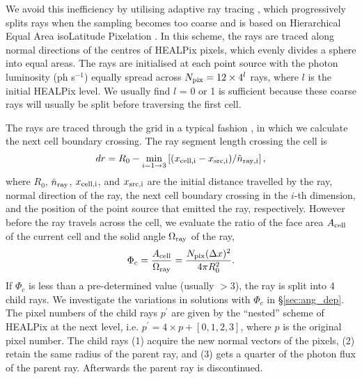 \documentclass[useAMS,usenatbib]{mn2e}
\begin{document}
We avoid this inefficiency by utilising adaptive ray tracing
\citep{Abel02_RT}, which progressively splits rays when the sampling
becomes too coarse and is based on Hierarchical Equal Area isoLatitude
Pixelation \citep[HEALPix;][]{HEALPix}.  In this scheme, the rays are
traced along normal directions of the centres of HEALPix pixels, which
evenly divides a sphere into equal areas.  The rays are initialised at
each point source with the photon luminosity (ph s$^{-1}$) equally
spread across $N_{\rm pix} = 12 \times 4^l$ rays, where $l$ is the
initial HEALPix level.  We usually find $l$ = 0 or 1 is sufficient
because these coarse rays will usually be split before traversing
the first cell.

The rays are traced through the grid in a typical fashion
\citep[e.g.][]{Abel99_RT}, in which we calculate the next cell
boundary crossing.  The ray segment length crossing the cell is
%
\begin{equation}
  \label{eqn:trace}
  dr = R_0 - \min_{i=1 \rightarrow 3} \left[(x_{\rm cell,i} - x_{\rm src,i}) /
    \hat{n}_{\rm ray,i} \right],
\end{equation}
%
where $R_0$, $\hat{n}_{\rm ray}$, $x_{\rm cell,i}$, and $x_{\rm
  src,i}$ are the initial distance travelled by the ray, normal
direction of the ray, the next cell boundary crossing in the $i$-th
dimension, and the position of the point source that emitted the ray,
respectively.  However before the ray travels across the cell, we
evaluate the ratio of the face area $A_{\rm cell}$ of the current cell
and the solid angle $\Omega_{\rm ray}$ of the ray,
%
\begin{equation}
  \label{eqn:split}
  \Phi_c = \frac{A_{\rm cell}} {\Omega_{\rm ray}} = 
  \frac{N_{\rm pix} (\Delta x)^2} {4\pi R_0^2}.
\end{equation}
%
If $\Phi_c$ is less than a pre-determined value (usually $>3$), the
ray is split into 4 child rays.  We investigate the variations in
solutions with $\Phi_c$ in \S\ref{sec:ang_dep}.  The pixel numbers
of the child rays $p^\prime$ are given by the ``nested'' scheme of
HEALPix at the next level, i.e. $p^\prime = 4 \times p + [0,1,2,3]$,
where $p$ is the original pixel number.  The child rays (1) acquire
the new normal vectors of the pixels, (2) retain the same radius of
the parent ray, and (3) gets a quarter of the photon flux of the
parent ray.  Afterwards the parent ray is discontinued.
\end{document}
